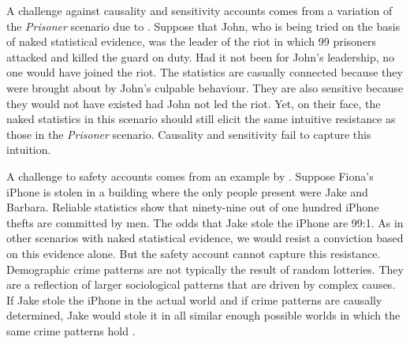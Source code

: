 \documentclass{article}
\begin{document}
A challenge against causality and sensitivity accounts comes from a variation of the \textit{Prisoner} scenario due to \cite{blome2015}.  Suppose that John, who is being tried on the basis of naked statistical evidence, was the leader of the riot in which 99 prisoners attacked and killed the guard on duty. %
Had it not been for John's leadership, no one would have joined the riot.
The statistics are casually connected because they were brought about by John's culpable behaviour. They are also sensitive because they would not have existed had John not led the riot. %
Yet, on their face, the naked statistics in this scenario should still elicit the same intuitive resistance as those in the \textit{Prisoner} scenario. Causality and sensitivity  fail to capture this intuition.  

%
A challenge to safety accounts
comes from an example by \cite{buchak2014}. Suppose Fiona's iPhone is stolen in a building where the only people present were Jake and Barbara. Reliable statistics show that ninety-nine out of one hundred iPhone thefts are committed by men. The odds that Jake stole the iPhone are 99:1. As in other scenarios with naked statistical evidence, we would resist a conviction based on this evidence alone.
But the safety account cannot capture this resistance. Demographic crime patterns are not typically the result of random lotteries.  They are a reflection of larger sociological patterns that are driven by complex causes. If Jake stole the iPhone in the actual world and if crime patterns are causally determined, Jake would stole it in all similar enough possible worlds in which the same crime patterns hold \citep{gardiner2020}. 
\end{document}
